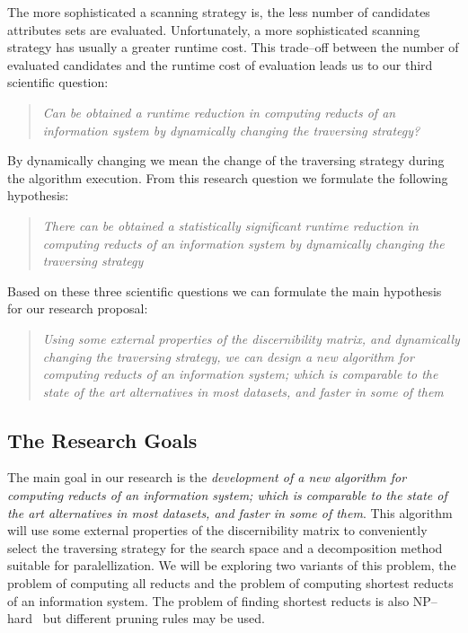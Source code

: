 \documentclass[authoryear,11pt]{elsarticle}
\begin{document}
  The more sophisticated a scanning strategy is, the less number of candidates attributes sets are 
  evaluated. Unfortunately, a more sophisticated scanning strategy has usually a greater runtime cost.
  This trade--off between the number of evaluated candidates and the runtime cost of evaluation leads us 
  to our third scientific question:
  
\begin{quote}
  \emph{Can be obtained a runtime reduction in computing reducts of an information system by 
  		dynamically changing the traversing strategy?}
\end{quote}
  By dynamically changing we mean the change of the traversing strategy during the algorithm execution.
  From this research question we formulate the following hypothesis:
    
\begin{quote}
  \emph{There can be obtained a statistically significant runtime reduction in computing reducts of an 
  		information system by dynamically changing the traversing strategy}
\end{quote}

  Based on these three scientific questions we can formulate the main hypothesis for our research proposal:
  
\begin{quote}
  \emph{Using some external properties of the discernibility matrix, and dynamically changing the traversing 
  		strategy, we can design a new algorithm for computing reducts of an information system; which is
  		comparable to the state of the art alternatives in most datasets, and faster in some of them}
\end{quote}  

\subsection{The Research Goals}\label{Goals} 
  The main goal in our research is the \emph{development of  a new algorithm for computing reducts of an 
  information system; which is comparable to the state of the art alternatives 
  in most datasets, and faster in some of them}. This algorithm will use some external properties of the
  discernibility matrix to conveniently select the traversing strategy for the search space and a 
  decomposition method suitable for paralellization. We will be exploring two variants of this problem,
  the problem of computing all reducts and the problem of computing shortest reducts of an information system.
  The problem of finding shortest reducts is also NP--hard~\citep{Lin04} but different pruning rules may
  be used.
  
\end{document}
